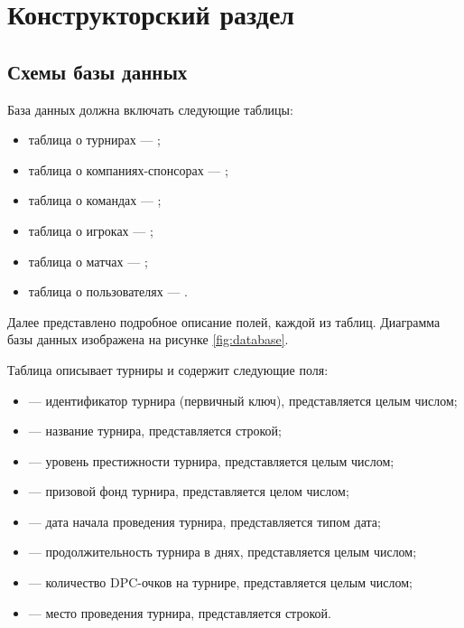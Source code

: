 \chapter{Конструкторский раздел}
\section{Схемы базы данных}

База данных должна включать следующие таблицы: 
\begin{itemize}
	\item таблица о турнирах --- ;
	\item таблица о компаниях-спонсорах --- ;
	\item таблица о командах --- ;
	\item таблица о игроках --- ;
	\item таблица о матчах --- ;
	\item таблица о пользователях --- .
\end{itemize}

Далее представлено подробное описание полей, каждой из таблиц. Диаграмма базы данных изображена на рисунке \ref{fig:database}.

Таблица  описывает турниры и содержит следующие поля:
\begin{itemize}
	\item {} --- идентификатор турнира (первичный ключ), представляется целым числом;
	\item {} --- название турнира, представляется строкой;
	\item {} --- уровень престижности турнира, представляется целым числом;
	\item {} --- призовой фонд турнира, представляется целом числом;
	\item {} --- дата начала проведения турнира, представляется типом дата;
	\item {} --- продолжительность турнира в днях, представляется целым числом;
	\item {} --- количество DPC-очков на турнире, представляется целым числом;
	\item {} --- место проведения турнира, представляется строкой.
\end{itemize}
\clearpage

